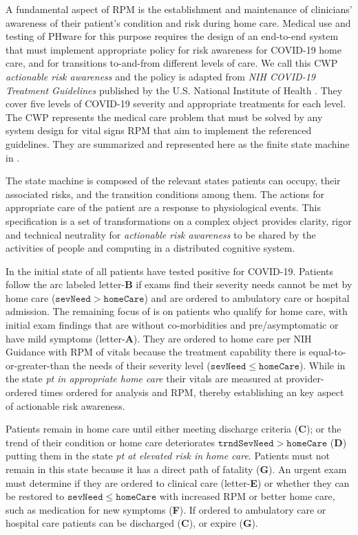 A fundamental aspect of RPM is the establishment and maintenance of clinicians' awareness of their patient’s condition and risk during home care.
Medical use and testing of PHware for this purpose requires the design of an end-to-end system that must implement appropriate policy for risk awareness for COVID-19 home care, and for transitions to-and-from different levels of care.
We call this CWP \emph{actionable risk awareness} and the policy is adapted from \emph{NIH COVID-19 Treatment Guidelines} published by the U.S. National Institute of Health \cite{NIH}.
They cover five levels of COVID-19 severity and appropriate treatments for each level.
The CWP represents the medical care problem that must be solved by any system design for vital signs RPM that aim to implement the referenced guidelines.
They are summarized and represented here as the finite state machine in .

The state machine is composed of the relevant states patients can occupy, their associated risks, and the transition conditions among them. The actions for appropriate care of the patient are a response to physiological events. This specification is a set of transformations on a complex object provides clarity, rigor and technical neutrality for \emph{actionable risk awareness} to be shared by the activities of people and computing in a distributed cognitive system.

In the initial state of  all patients have tested positive for COVID-19. Patients follow the arc labeled letter-\textbf{B} if exams find their severity needs cannot be met by home care ($\mathtt{sevNeed} > \mathtt{homeCare}$) and are ordered to ambulatory care or hospital admission.
The remaining focus of  is on patients who qualify for home care, with initial exam findings that are without co-morbidities and pre/asymptomatic or have mild symptoms  (letter-\textbf{A}).
They are ordered to home care per NIH Guidance with RPM of vitals because the treatment capability there is equal-to-or-greater-than the needs of their severity level ($\mathtt{sevNeed} \le \mathtt{homeCare}$).
While in the state \emph{pt in appropriate home care} their vitals are measured at provider-ordered times ordered for analysis and RPM, thereby establishing an key aspect of actionable risk awareness.

Patients remain in home care until either meeting discharge criteria (\textbf{C}); or the trend of their condition or home care deteriorates $\mathtt{trndSevNeed} > \mathtt{homeCare}$ (\textbf{D}) putting them in the state \emph{pt at elevated risk in home care}.
Patients must not remain in this state because it has a direct path of fatality (\textbf{G}).
An urgent exam must determine if they are ordered to clinical care (letter-\textbf{E}) or whether they can be restored to $\mathtt{sevNeed} \le \mathtt{homeCare}$ with increased RPM or better home care, such as medication for new symptoms (\textbf{F}).
If ordered to ambulatory care or hospital care patients can be discharged (\textbf{C}), or expire (\textbf{G}).

